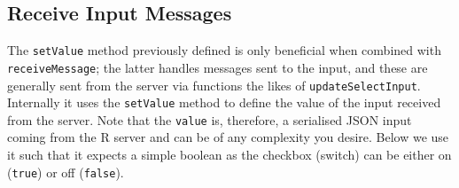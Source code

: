 \documentclass[10pt,]{krantz}
\makeatletter
\newenvironment{Shaded}{\begin{snugshade}}{\end{snugshade}}
\newcommand{\AttributeTok}[1]{\textcolor[rgb]{0.61,0.61,0.61}{#1}}
\newcommand{\CommentTok}[1]{\textcolor[rgb]{0.37,0.37,0.37}{\textit{#1}}}
\newcommand{\ControlFlowTok}[1]{\textcolor[rgb]{0.27,0.27,0.27}{\textbf{#1}}}
\newcommand{\DataTypeTok}[1]{\textcolor[rgb]{0.27,0.27,0.27}{#1}}
\newcommand{\KeywordTok}[1]{\textcolor[rgb]{0.27,0.27,0.27}{\textbf{#1}}}
\newcommand{\NormalTok}[1]{#1}
\newcommand{\OperatorTok}[1]{\textcolor[rgb]{0.43,0.43,0.43}{\textbf{#1}}}
\newcommand{\StringTok}[1]{\textcolor[rgb]{0.5,0.5,0.5}{#1}}
\newcommand{\VariableTok}[1]{\textcolor[rgb]{0,0,0}{#1}}
\newenvironment{kframe}{%
\medskip{}
\setlength{\fboxsep}{.8em}
 \def\at@end@of@kframe{}%
 \ifinner\ifhmode%
  \def\at@end@of@kframe{\end{minipage}}%
  \begin{minipage}{\columnwidth}%
 \fi\fi%
 \def\FrameCommand##1{\hskip\@totalleftmargin \hskip-\fboxsep
 \colorbox{shadecolor}{##1}\hskip-\fboxsep
     \hskip-\linewidth \hskip-\@totalleftmargin \hskip\columnwidth}%
 \MakeFramed {\advance\hsize-\width
   \@totalleftmargin\z@ \linewidth\hsize
   \@setminipage}}%
 {\par\unskip\endMakeFramed%
 \at@end@of@kframe}
\renewenvironment{Shaded}{\begin{kframe}}{\end{kframe}}
\makeatother
\begin{document}
\hypertarget{shiny-input-receive-msg}{%
\subsection{Receive Input Messages}\label{shiny-input-receive-msg}}

The \texttt{setValue} method previously defined is only beneficial when combined with \texttt{receiveMessage}; the latter handles messages sent to the input, and these are generally sent from the server via functions the likes of \texttt{updateSelectInput}. Internally it uses the \texttt{setValue} method to define the value of the input received from the server. Note that the \texttt{value} is, therefore, a serialised JSON input coming from the R server and can be of any complexity you desire. Below we use it such that it expects a simple boolean as the checkbox (switch) can be either on (\texttt{true}) or off (\texttt{false}).

\begin{Shaded}
\end{Shaded}
\end{document}
